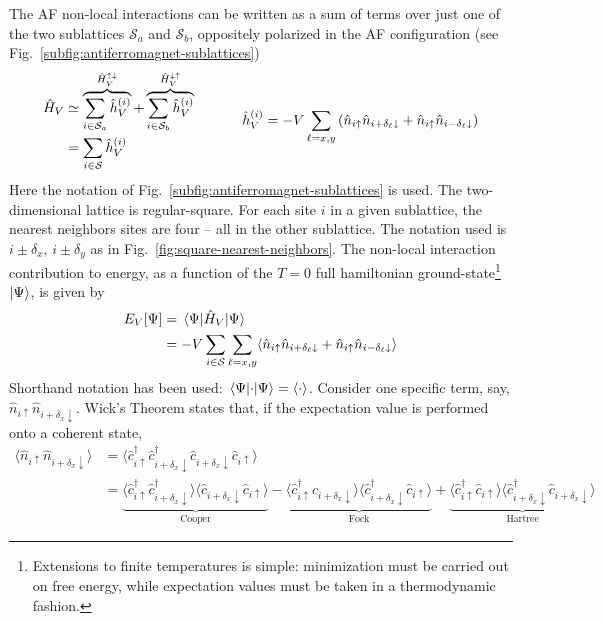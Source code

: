 The AF non-local interactions can be written as a sum of terms over just one of the two sublattices $\mathcal{S}_a$ and $\mathcal{S}_b$, oppositely polarized in the AF configuration (see Fig.~\ref{subfig:antiferromagnet-sublattices})
\[
	\begin{aligned}
		\hat H_V &\simeq \overbrace{
			\sum_{i \in \mathcal{S}_a} \hat h_V^{(i)}
		}^{\hat H_V^{\uparrow\downarrow}} + \overbrace{
			\sum_{i \in \mathcal{S}_b} \hat h_V^{(i)}
		}^{\hat H_V^{\downarrow\uparrow}} \\
		&= \sum_{i \in \mathcal{S}} \hat h_V^{(i)}
	\end{aligned}
	\hspace{0.1\textwidth}
	\hat h_V^{(i)} = -V \sum_{\ell = x,y} \left(
		\hat n_{i\uparrow} \hat n_{i + \delta_\ell \downarrow} + \hat n_{i\uparrow} \hat n_{i - \delta_\ell \downarrow} 
	\right) 
\]
Here the notation of Fig.~\ref{subfig:antiferromagnet-sublattices} is used. The two-dimensional lattice is regular-square. For each site $i$ in a given sublattice, the nearest neighbors sites are four -- all in the other sublattice. The notation used is $i \pm \delta_x$, $i \pm  \delta_y$ as in Fig.~\ref{fig:square-nearest-neighbors}. The non-local interaction contribution to energy, as a function of the $T=0$ full hamiltonian ground-state\footnote{
	Extensions to finite temperatures is simple: minimization must be carried out on free energy, while expectation values must be taken in a thermodynamic fashion.
} $\ket{\Psi}$, is given by
\[
\begin{aligned}
	E_V [\Psi] &= \mel{\Psi}{\hat H_V}{\Psi} \\
	&= -V \sum_{i \in \mathcal{S}} \sum_{\ell = x,y} \langle
	\hat n_{i\uparrow} \hat n_{i + \delta_\ell \downarrow} + \hat n_{i\uparrow} \hat n_{i - \delta_\ell \downarrow}
	\rangle 
\end{aligned}
\]
Shorthand notation has been used: $\mel{\Psi}{\cdot}{\Psi} = \langle \cdot \rangle$. Consider one specific term, say, $\hat n_{i\uparrow} \hat n_{i + \delta_x \downarrow}$. Wick's Theorem states that, if the expectation value is performed onto a coherent state,
\[
\begin{aligned}
	\langle 
	\hat n_{i\uparrow} \hat n_{i + \delta_x \downarrow}
	\rangle &= \langle 
	\hat c_{i\uparrow}^\dagger \hat c_{i + \delta_x \downarrow}^\dagger \hat c_{i + \delta_x \downarrow} \hat c_{i\uparrow} 
	\rangle \\
	&= 
	\underbrace{
		\langle 
			\hat c_{i\uparrow}^\dagger \hat c_{i + \delta_x \downarrow}^\dagger
		\rangle \langle	
			\hat c_{i + \delta_x \downarrow} \hat c_{i\uparrow} 
		\rangle 
	}_{\text{Cooper}}
	- 
	\underbrace{
		\langle 
			\hat c_{i\uparrow}^\dagger \hat c_{i + \delta_x \downarrow}
		\rangle \langle	
			\hat c_{i + \delta_x \downarrow}^\dagger \hat c_{i\uparrow} 
		\rangle 
	}_{\text{Fock}}
	+ 
	\underbrace{
		\langle 
			\hat c_{i\uparrow}^\dagger \hat c_{i\uparrow}
		\rangle \langle	
			\hat c_{i + \delta_x \downarrow}^\dagger \hat c_{i + \delta_x \downarrow} 
		\rangle
	}_{\text{Hartree}}
\end{aligned}
\]
